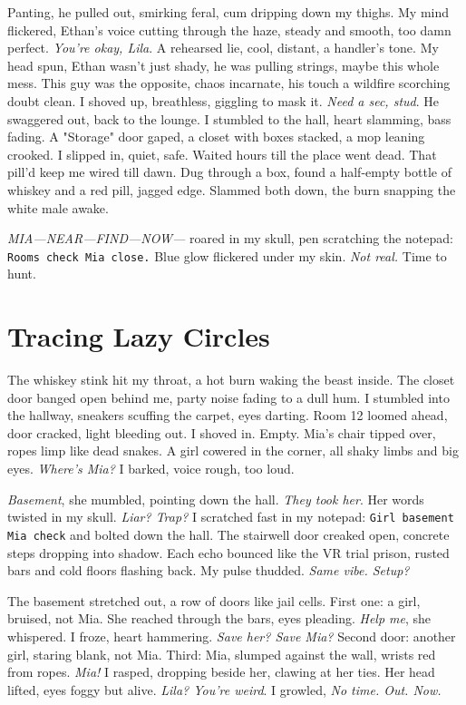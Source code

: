 \documentclass[12pt,oneside]{book}
\newcommand{\note}[1]{\texttt{#1}}
\begin{document}
Panting, he pulled out, smirking feral, cum dripping down my thighs. My mind flickered, Ethan’s voice cutting through the haze, steady and smooth, too damn perfect. \textit{You’re okay, Lila}. A rehearsed lie, cool, distant, a handler’s tone. My head spun, Ethan wasn’t just shady, he was pulling strings, maybe this whole mess. This guy was the opposite, chaos incarnate, his touch a wildfire scorching doubt clean. I shoved up, breathless, giggling to mask it. \textit{Need a sec, stud}. He swaggered out, back to the lounge. I stumbled to the hall, heart slamming, bass fading. A "Storage" door gaped, a closet with boxes stacked, a mop leaning crooked. I slipped in, quiet, safe. Waited hours till the place went dead. That pill’d keep me wired till dawn. Dug through a box, found a half-empty bottle of whiskey and a red pill, jagged edge. Slammed both down, the burn snapping the white male awake.

\textit{MIA—NEAR—FIND—NOW—} roared in my skull, pen scratching the notepad: \note{Rooms check Mia close.} Blue glow flickered under my skin. \textit{Not real.} Time to hunt.

\chapter{Tracing Lazy Circles}

The whiskey stink hit my throat, a hot burn waking the beast inside. The closet door banged open behind me, party noise fading to a dull hum. I stumbled into the hallway, sneakers scuffing the carpet, eyes darting. Room 12 loomed ahead, door cracked, light bleeding out. I shoved in. Empty. Mia’s chair tipped over, ropes limp like dead snakes. A girl cowered in the corner, all shaky limbs and big eyes. \textit{Where’s Mia?} I barked, voice rough, too loud.

\textit{Basement}, she mumbled, pointing down the hall. \textit{They took her}. Her words twisted in my skull. \textit{Liar? Trap?} I scratched fast in my notepad: \note{Girl basement Mia check} and bolted down the hall. The stairwell door creaked open, concrete steps dropping into shadow. Each echo bounced like the VR trial prison, rusted bars and cold floors flashing back. My pulse thudded. \textit{Same vibe. Setup?}

The basement stretched out, a row of doors like jail cells. First one: a girl, bruised, not Mia. She reached through the bars, eyes pleading. \textit{Help me}, she whispered. I froze, heart hammering. \textit{Save her? Save Mia?} Second door: another girl, staring blank, not Mia. Third: Mia, slumped against the wall, wrists red from ropes. \textit{Mia!} I rasped, dropping beside her, clawing at her ties. Her head lifted, eyes foggy but alive. \textit{Lila? You’re weird}. I growled, \textit{No time. Out. Now.}
\end{document}
